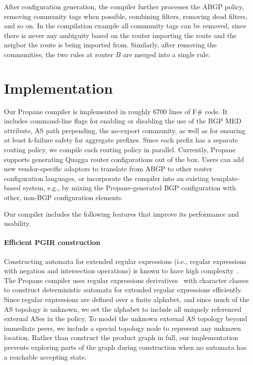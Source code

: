 \documentclass[10pt]{sigalternate052015}
\newcommand{\sysname}{{\small \sf Propane}\xspace}
\newcommand{\para}[1]{\paragraph*{\textbf{#1}}}
\begin{document}
After configuration generation, the compiler further processes the ABGP policy, removing community tags when possible, combining filters, removing dead filters, and so on. In the compilation example all community tags can be removed, since there is never any ambiguity based on the router importing the route and the neigbor the route is being imported from. Similarly, after removing the communities, the two rules at router $B$ are merged into a single rule.



%
%
%
%



\section{Implementation}
\label{sec:implementation}

Our \sysname compiler is implemented in roughly 6700 lines of F\# code. It includes command-line flags for enabling or disabling the use of the BGP MED attribute, AS path prepending, the no-export community, as well as for ensuring at least k-failure safety for aggregate prefixes. Since each prefix has a separate routing policy, we compile each routing policy in parallel. Currently, \sysname supports generating Quagga router configurations out of the box. Users can add new vendor-specific adaptors to translate from ABGP to other router configuration languages, or incorporate the compiler into an existing template-based system, e.g., by mixing the \sysname-generated BGP configuration with other, non-BGP configuration elements.

Our compiler includes the following features that improve its performance and usability.

\para{Efficient PGIR construction}

Constructing automata for extended regular expressions (i.e., regular expressions with negation and intersection operations) is known to have high complexity~\cite{regex-complexity}. The \sysname compiler uses regular expressions derivatives~\cite{regex-derivatives} with character classes to construct deterministic automata for extended regular expressions efficiently. Since regular expressions are defined over a finite alphabet, and since much of the AS topology is unknown, we set the alphabet to include all uniquely referenced external ASes in the policy. To model the unknown external AS topology beyond immediate peers, we include a special topology node to represent any unknown location.
%
Rather than construct the product graph in full, our implementation prevents exploring parts of the graph during construction when no automata has a reachable accepting state.
\end{document}
